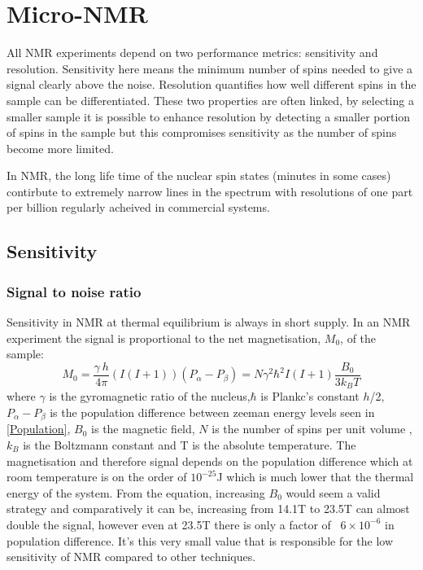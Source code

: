 \section{Micro-NMR}\label{Micro-NMR}

All NMR experiments depend on two performance metrics: sensitivity and resolution. Sensitivity
here means the minimum number of spins needed to give a signal clearly above the noise. Resolution
quantifies how well different spins in the sample can be differentiated. These two properties
are often linked, by selecting a smaller sample it is possible to enhance resolution by detecting
a smaller portion of spins in the sample but this compromises sensitivity as the number of spins become more
limited.

 In NMR, the long life time of the nuclear spin states (minutes in some cases) contirbute to extremely
 narrow lines in the spectrum with resolutions of one part per billion regularly acheived in
 commercial systems.

 \subsection{Sensitivity}

 \subsubsection{Signal to noise ratio}


 Sensitivity in NMR at thermal equilibrium is always in short supply. In an NMR experiment the signal
 is proportional to the net magnetisation, $M_0$, of the sample\citep{webb2005nmr}:
\begin{equation}\label{eqn:Webb}
  M_0 = \frac{\gamma~h}{4\pi}(I(I+1))(P_{\alpha}-P_{\beta}) = N\gamma^2\hbar^2I(I+1)\frac{B_0}{3k_BT}
\end{equation}
where $\gamma$ is the gyromagnetic ratio of the nucleus,$\hbar$ is Plankc's constant $h$/2\pi, $P_{\alpha}-P_{\beta}$ is the population difference between zeeman energy levels seen in \ref{Population}, $B_0$ is the magnetic field, $N$ is
the number of spins per unit volume , $k_B$ is the Boltzmann constant and T is the absolute temperature. The magnetisation
and therefore signal depends on the population difference which at room temperature is on the order of $10^{-25}$J
which is much lower that the thermal energy of the system. From the equation, increasing $B_0$ would seem a
valid strategy and comparatively it can be, increasing from 14.1T to 23.5T can almost double the signal,
however even at 23.5T there is only a factor of ~$6\times10^{-6}$ in population difference. It's this
very small value that is responsible for the low sensitivity of NMR compared to other techniques.

